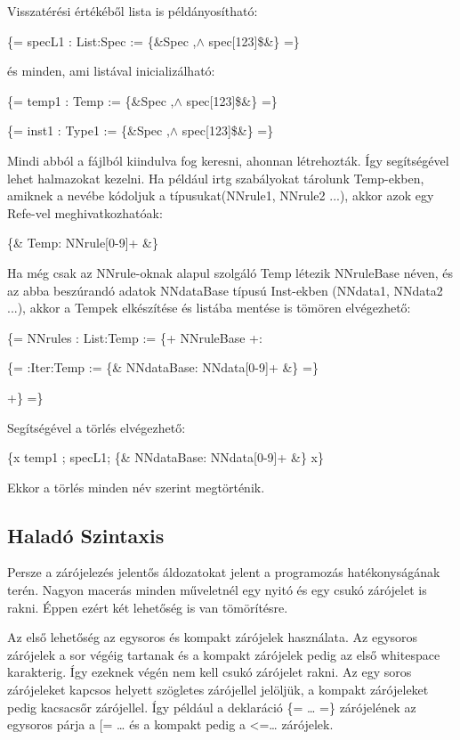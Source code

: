 Visszatérési értékéből lista is példányosítható:

\{= specL1 : List:Spec := \{\&Spec ,$\land$ spec[123]\$\&\} =\}

és minden, ami listával inicializálható:

\{= temp1 : Temp := \{\&Spec ,$\land$ spec[123]\$\&\} =\}

\{= inst1 : Type1 := \{\&Spec ,$\land$ spec[123]\$\&\} =\}

Mindi abból a fájlból kiindulva fog keresni, ahonnan létrehozták.
Így segítségével lehet halmazokat kezelni.
Ha például irtg szabályokat tárolunk Temp-ekben, amiknek a nevébe kódoljuk a típusukat(NNrule1, NNrule2 ...),
akkor azok egy Refe-vel meghivatkozhatóak:

\{\& Temp: NNrule[0-9]+ \&\}

Ha még csak az NNrule-oknak alapul szolgáló Temp létezik NNruleBase néven, 
és az abba beszúrandó adatok  NNdataBase típusú Inst-ekben (NNdata1, NNdata2 ...),
akkor a Tempek elkészítése és listába mentése is tömören elvégezhető:

\{= NNrules : List:Temp := \{+ NNruleBase +: 

\{= :Iter:Temp := \{\& NNdataBase: NNdata[0-9]+ \&\} =\} 

+\} =\}

Segítségével a törlés elvégezhető:

\{x temp1 ; specL1; \{\& NNdataBase: NNdata[0-9]+ \&\} x\}

Ekkor a törlés minden név szerint megtörténik.



\subsection{Haladó Szintaxis}
Persze a zárójelezés jelentős áldozatokat jelent a programozás hatékonyságának terén. 
Nagyon macerás minden műveletnél egy nyitó és egy csukó zárójelet is rakni. 
Éppen ezért két lehetőség is van tömörítésre.

Az első lehetőség az egysoros és kompakt zárójelek használata. 
Az egysoros zárójelek a sor végéig tartanak és a kompakt zárójelek pedig az első whitespace karakterig. 
Így ezeknek végén nem kell csukó zárójelet rakni. 
Az egy soros zárójeleket kapcsos helyett szögletes zárójellel jelöljük, a kompakt zárójeleket pedig kacsacsőr zárójellel. 
Így például a deklaráció \{= … =\} zárójelének az egysoros párja a [= … és a kompakt pedig a <=… zárójelek.

